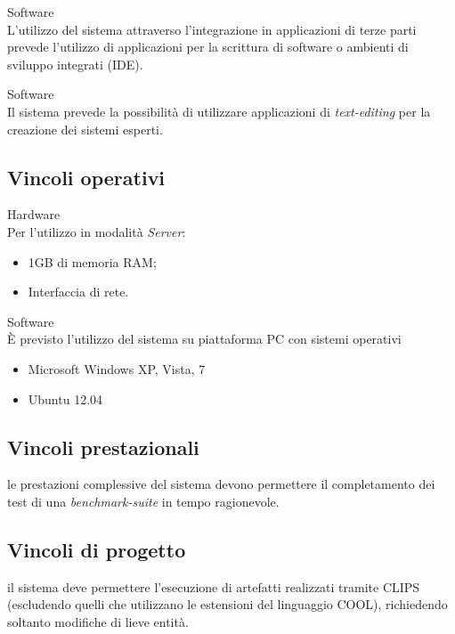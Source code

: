 	\item Software\\
	L'utilizzo del sistema attraverso l'integrazione in applicazioni di terze parti prevede l'utilizzo di applicazioni per la scrittura di software o ambienti di sviluppo integrati (IDE).
	
	\item Software\\
	Il sistema prevede la possibilità di utilizzare applicazioni di \emph{text-editing} per la creazione dei sistemi esperti.
	
\vincoliend

\subsection{Vincoli operativi}

\vincolistart
	\item Hardware\\
	Per l'utilizzo in modalità \emph{Server}:
	\begin{itemize}
		\item 1GB di memoria RAM;
		\item Interfaccia di rete.
	\end{itemize}
	\item Software\\
	\`E previsto l'utilizzo del sistema su piattaforma PC con sistemi operativi
	\begin{itemize}
		\item Microsoft Windows XP, Vista, 7
		\item Ubuntu 12.04
	\end{itemize}
\vincoliend

\subsection{Vincoli prestazionali}
\vincolistart
	\item le prestazioni complessive del sistema devono permettere il completamento dei test di una \emph{benchmark-suite} in tempo ragionevole.
\vincoliend
\subsection{Vincoli di progetto}
\vincolistart
	\item il sistema deve permettere l'esecuzione di artefatti realizzati tramite CLIPS (escludendo quelli che utilizzano le estensioni del linguaggio COOL), richiedendo soltanto modifiche di lieve entità.
	
